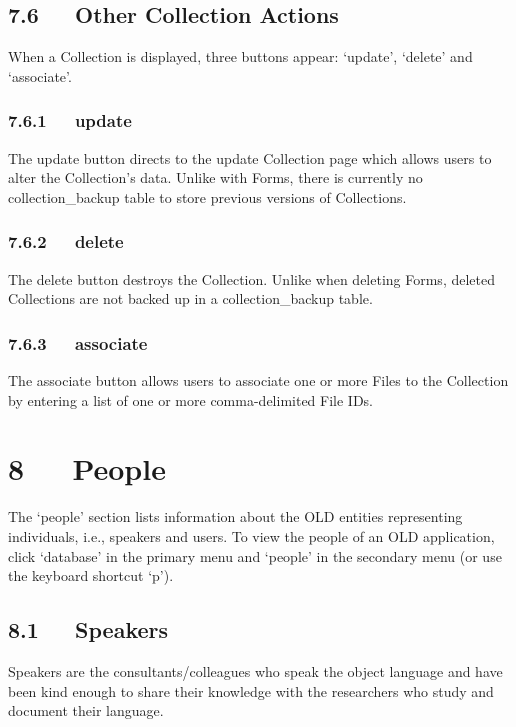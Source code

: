 \documentclass[letterpaper,10pt,english]{sphinxmanual}
\begin{document}
\section{7.6   Other Collection Actions}
\label{documentation:other-collection-actions}
When a Collection is displayed, three buttons appear: `update', `delete' and
`associate'.


\subsection{7.6.1   update}
\label{documentation:id17}
The update button directs to the update Collection page which allows users to
alter the Collection's data.  Unlike with Forms, there is currently no
collection\_backup table to store previous versions of Collections.


\subsection{7.6.2   delete}
\label{documentation:id18}
The delete button destroys the Collection.  Unlike when deleting Forms, deleted
Collections are not backed up in a collection\_backup table.


\subsection{7.6.3   associate}
\label{documentation:id19}
The associate button allows users to associate one or more Files to the
Collection by entering a list of one or more comma-delimited File IDs.


\chapter{8   People}
\label{documentation:people}
The `people' section lists information about the OLD entities representing
individuals, i.e., speakers and users.  To view the people of an OLD
application, click `database' in the primary menu and `people' in the secondary
menu (or use the keyboard shortcut `p').


\section{8.1   Speakers}
\label{documentation:speakers}
Speakers are the consultants/colleagues who speak the object language and have
been kind enough to share their knowledge with the researchers who study and
document their language.
\end{document}
